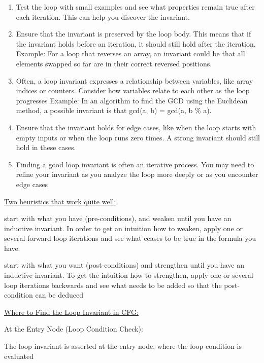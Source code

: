 \documentclass[landscape, a4paper]{article}
\begin{document}
\begin{minipage}[t]{0.2\linewidth}
\begin{betterlist}
\begin{enumerate}
			\item Test the loop with small examples and see what properties remain true after each iteration. This can help you discover the invariant.
			\item Ensure that the invariant is preserved by the loop body. This means that if the invariant holds before an iteration, it should still hold after the iteration. Example: For a loop that reverses an array, an invariant could be that all elements swapped so far are in their correct reversed positions.
			\item Often, a loop invariant expresses a relationship between variables, like array indices or counters. Consider how variables relate to each other as the loop progresses Example: In an algorithm to find the GCD using the Euclidean method, a possible invariant is that gcd(a, b) = gcd(a, b \% a).
			\item Ensure that the invariant holds for edge cases, like when the loop starts with empty inputs or when the loop runs zero times. A strong invariant should still hold in these cases.
			\item Finding a good loop invariant is often an iterative process. You may need to refine your invariant as you analyze the loop more deeply or as you encounter edge cases
		\end{enumerate}
		\item \underline{Two heuristics that work quite well:}
		\begin{betterlist}
			\item start with what you have (pre-conditions), and weaken until you have an inductive invariant. In order to get an intuition how to weaken, apply one or several forward loop iterations and see what ceases to be true in the formula you have.
			\item start with what you want (post-conditions) and strengthen until you have an inductive invariant. To get the intuition how to strengthen, apply one or several loop iterations backwards and see what needs to be added so that the post-condition can be deduced
		\end{betterlist}
		\item \underline{Where to Find the Loop Invariant in CFG:}
		\begin{betterlist}
			\item At the Entry Node (Loop Condition Check):
			\begin{betterlist}
				\item The loop invariant is asserted at the entry node, where the loop condition is evaluated

\end{betterlist}
\end{betterlist}
\end{betterlist}
\end{minipage}
\end{document}
